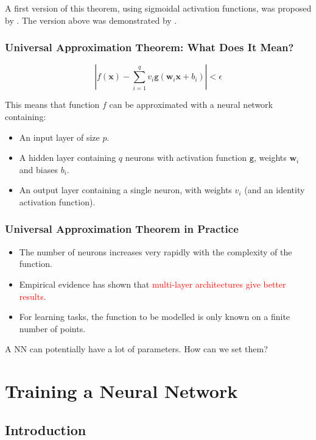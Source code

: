 \documentclass{book}
\newcommand{\x}{\mathbf{x}}
\newcommand{\act}{\texttt{g}}%
\newcommand{\alert}[1]{\textcolor{red}{#1}}
\begin{document}
A first version of this theorem, using sigmoidal activation functions, was proposed by \cite{cybenko_approximations_1989}. The version above was demonstrated by \cite{hornik_approximation_1991}.

\subsection{Universal Approximation Theorem: What Does It Mean?}

\[
\left| f(\x) - \sum\limits_{i=1}^q v_i \act(\mathbf{w}_i\x + b_i) \right| < \epsilon
\]

This means that function $f$ can be approximated with a neural network containing:
\begin{itemize}
\item An input layer of size $p$.
\item A hidden layer containing $q$ neurons with activation function $\act$, weights $\mathbf{w}_i$ and biases $b_i$.
\item An output layer containing a single neuron, with weights $v_i$ (and an identity activation function).
\end{itemize}

\subsection{Universal Approximation Theorem in Practice}

\begin{itemize}
\item The number of neurons increases very rapidly with the complexity of the function.
\item Empirical evidence has shown that \alert{multi-layer architectures give better results}.
\item For learning tasks, the function to be modelled is only known on a finite number of points.
\end{itemize}

\begin{myblock}{}
A NN can potentially have a lot of parameters. How can we set them?
\end{myblock}

\chapter{Training a Neural Network}

\section{Introduction}
\end{document}
